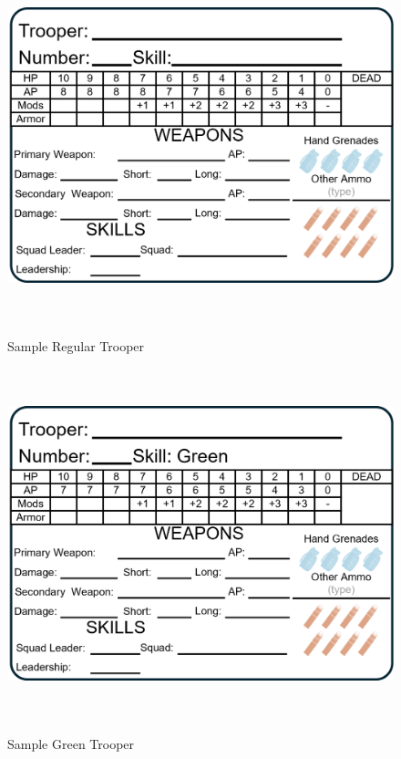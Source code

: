 \begin{figure}[!h]
  \centering
  \includegraphics[alt='Sample Regular Trooper', width=5.63in, height=4in]{img/RegularTrooper.png}
  \caption*{Sample Regular Trooper}
\end{figure}

\begin{figure}[!h]
  \centering
  \includegraphics[alt='Sample Green Trooper', width=5.63in, height=4in]{img/GreenTrooper.png}
  \caption*{Sample Green Trooper}
\end{figure}

